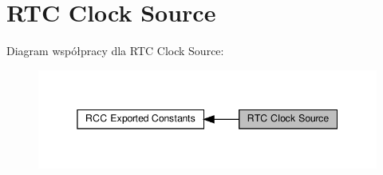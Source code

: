 \hypertarget{group___r_c_c___r_t_c___clock___source}{}\section{R\+TC Clock Source}
\label{group___r_c_c___r_t_c___clock___source}
Diagram współpracy dla R\+TC Clock Source\+:\nopagebreak
\begin{figure}[H]
\begin{center}
\leavevmode
\includegraphics[width=345pt]{group___r_c_c___r_t_c___clock___source}
\end{center}
\end{figure}
